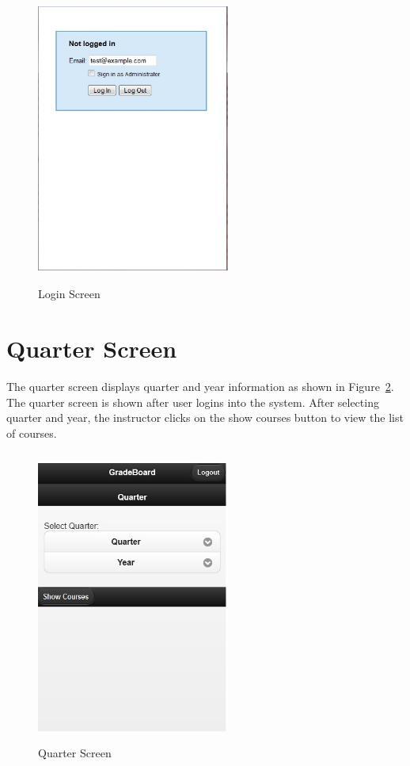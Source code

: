 \vspace{3em}
\begin{figure}[H]
\begin{center}
\includegraphics[height=3.8in,width=2.5in]{images/login_screen.jpg}
\caption{Login Screen}
\label{fig:login_screen}
\end{center}
\end{figure}

\newpage
\section{Quarter Screen}
The quarter screen displays quarter and year information as shown in Figure~\ref{fig:quarter_screen}. The quarter screen is shown after user logins into the system. After selecting quarter and year, the instructor clicks on the show courses button to view the list of courses.

\vspace{3em}
\begin{figure}[H]
\begin{center}
\includegraphics[height=3.8in,width=2.5in]{images/quarter_screen.jpg}
\caption{Quarter Screen}
\label{fig:quarter_screen}
\end{center}
\end{figure}

